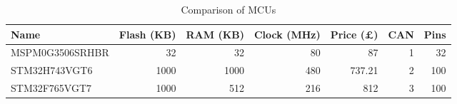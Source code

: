 \begin{table}[h]
  \centering
  \begin{tabular}{lrrrrrr}
    \toprule
    \textbf{Name} & \textbf{Flash (KB)} & \textbf{RAM (KB)} & \textbf{Clock (MHz)} & \textbf{Price (£)} & \textbf{CAN} & \textbf{Pins} \\
    \midrule
    MSPM0G3506SRHBR\cite{ti_mspm0g3506srhbr} & 32 & 32 & 80 & 87 & 1 & 32 \\
    STM32H743VGT6\cite{st_stm32h743vg} & 1000 & 1000 & 480 & 737.21 & 2 & 100 \\
    STM32F765VGT7\cite{st_stm32f765vg} & 1000 & 512 & 216 & 812 & 3 & 100 \\
    \bottomrule
  \end{tabular}
  \caption{Comparison of MCUs}
  \label{tab:mcu-comparison}
\end{table}